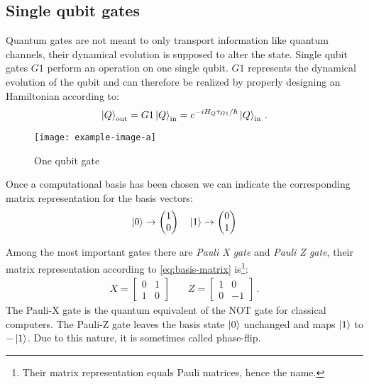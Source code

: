 \subsection{Single qubit gates}
Quantum gates are not meant to only transport information like quantum channels, their dynamical evolution is supposed to alter the state.
Single qubit gates $G1$ perform an operation on one single qubit. $G1$ represents the dynamical evolution of the qubit and can therefore be realized by properly designing an Hamiltonian according to:
\begin{equation*}
   \ket{Q}_\text{out} = G1\ket{Q}_\text{in} = e^{-iH_Q \tau_{G1}/\hbar}\ket{Q}_\text{in}\,.
\end{equation*}
\begin{figure}
\centering
\texttt{[image: example-image-a]}
\caption{One qubit gate}
\label{fig:single-qubit-gate}
\end{figure}


Once a computational basis has been chosen we can indicate the corresponding matrix representation for the basis vectors:
\begin{equation}\label{eq:basis-matrix}
    \ket{0} \rightarrow \begin{pmatrix} 1 \\ 0 \end{pmatrix} \quad \ket{1} \rightarrow \begin{pmatrix} 0 \\ 1 \end{pmatrix}
\end{equation}

Among the most important gates there are \emph{Pauli X gate} and \emph{Pauli Z gate}, their matrix representation according to \ref{eq:basis-matrix} is\footnote{Their matrix representation equals Pauli matrices, hence the name.}:
\begin{align*}
    X = 
    \begin{bmatrix}
    0 & 1\\
    1 & 0
    \end{bmatrix} 
    \quad &
     Z = 
    \begin{bmatrix}
    1 & 0\\
    0 & -1
    \end{bmatrix}\,.
\end{align*}
The Pauli-X gate is the quantum equivalent of the NOT gate for classical computers. 
The Pauli-Z gate leaves the basis state $\ket{0}$  unchanged and maps $\ket{1}$  to $-\ket{1}$. Due to this nature, it is sometimes called phase-flip. 
